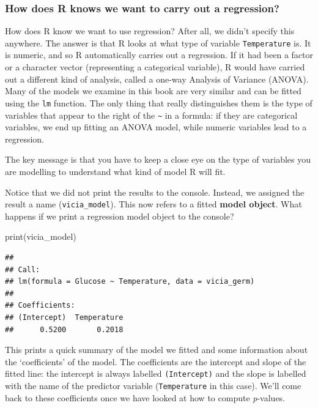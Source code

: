 \documentclass[
]{book}
\newenvironment{Shaded}{\begin{snugshade}}{\end{snugshade}}
\newcommand{\FunctionTok}[1]{\textcolor[rgb]{0.00,0.00,0.00}{#1}}
\newcommand{\NormalTok}[1]{#1}
\newenvironment{greybox}{
  \definecolor{shadecolor}{rgb}{0.95,0.95,0.95}  %
  \color{black}
  \begin{shaded}}
 {\end{shaded}}
\newenvironment{infobox}[1]
  {
  \begin{itemize}
  \renewcommand{\labelitemi}{
    \raisebox{-.7\height}[0pt][0pt]{
      {\setkeys{Gin}{width=3em,keepaspectratio}
        \texttt{[image: images/\#1]}}
    }
  }
  \setlength{\fboxsep}{1em}
  \begin{greybox}
  \item
  }
  {
  \end{greybox}
  \end{itemize}
  }
\begin{document}
\begin{infobox}{information}

\hypertarget{how-does-r-knows-we-want-to-carry-out-a-regression}{%
\subsubsection*{How does R knows we want to carry out a regression?}\label{how-does-r-knows-we-want-to-carry-out-a-regression}}

How does R know we want to use regression? After all, we didn't specify this anywhere. The answer is that R looks at what type of variable \texttt{Temperature} is. It is numeric, and so R automatically carries out a regression. If it had been a factor or a character vector (representing a categorical variable), R would have carried out a different kind of analysis, called a one-way Analysis of Variance (ANOVA). Many of the models we examine in this book are very similar and can be fitted using the \texttt{lm} function. The only thing that really distinguishes them is the type of variables that appear to the right of the \texttt{\textasciitilde{}} in a formula: if they are categorical variables, we end up fitting an ANOVA model, while numeric variables lead to a regression.

The key message is that you have to keep a close eye on the type of variables you are modelling to understand what kind of model R will fit.

\end{infobox}

Notice that we did not print the results to the console. Instead, we assigned the result a name (\texttt{vicia\_model}). This now refers to a fitted \textbf{model object}. What happens if we print a regression model object to the console?

\begin{Shaded}
\begin{Highlighting}[]
\FunctionTok{print}\NormalTok{(vicia\_model)}
\end{Highlighting}
\end{Shaded}

\begin{verbatim}
## 
## Call:
## lm(formula = Glucose ~ Temperature, data = vicia_germ)
## 
## Coefficients:
## (Intercept)  Temperature  
##      0.5200       0.2018
\end{verbatim}

This prints a quick summary of the model we fitted and some information about the `coefficients' of the model. The coefficients are the intercept and slope of the fitted line: the intercept is always labelled \texttt{(Intercept)} and the slope is labelled with the name of the predictor variable (\texttt{Temperature} in this case). We'll come back to these coefficients once we have looked at how to compute \emph{p}-values.
\end{document}
